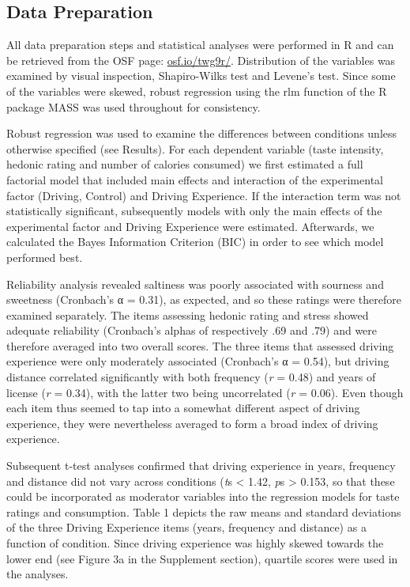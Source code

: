 \documentclass[authordate, empirical, issue]{jote-new-article}
\begin{document}
\subsection{Data Preparation}



All data preparation steps and statistical analyses were performed in R \parencites{RCoreTeam2019} and can be retrieved from the OSF page: \href{https://osf.io/twg9r/}{osf.io/twg9r/}. Distribution of the variables was examined by visual inspection, Shapiro-Wilks test and Levene’s test. Since some of the variables were skewed, robust regression using the rlm function of the R package MASS was used throughout for consistency.



Robust regression was used to examine the differences between conditions unless otherwise specified (see Results). For each dependent variable (taste intensity, hedonic rating and number of calories consumed) we first estimated a full factorial model that included main effects and interaction of the experimental factor (Driving, Control) and Driving Experience. If the interaction term was not statistically significant, subsequently models with only the main effects of the experimental factor and Driving Experience were estimated. Afterwards, we calculated the Bayes Information Criterion (BIC) in order to see which model performed best.



Reliability analysis revealed saltiness was poorly associated with sourness and sweetness (Cronbach’s α = 0.31), as expected, and so these ratings were therefore examined separately. The items assessing hedonic rating and stress showed adequate reliability (Cronbach’s alphas of respectively .69 and .79) and were therefore averaged into two overall scores. The three items that assessed driving experience were only moderately associated (Cronbach’s α = 0.54), but driving distance correlated significantly with both frequency (\emph{r} = 0.48) and years of license (\emph{r} = 0.34), with the latter two being uncorrelated (\emph{r} = 0.06). Even though each item thus seemed to tap into a somewhat different aspect of driving experience, they were nevertheless averaged to form a broad index of driving experience.




Subsequent t-test analyses confirmed that driving experience in years, frequency and distance did not vary across conditions (\emph{t}s < 1.42, \emph{p}s > 0.153, so that these could be incorporated as moderator variables into the regression models for taste ratings and consumption. Table 1 depicts the raw means and standard deviations of the three Driving Experience items (years, frequency and distance) as a function of condition. Since driving experience was highly skewed towards the lower end (see Figure 3a in the Supplement section), quartile scores were used in the analyses.
\end{document}
